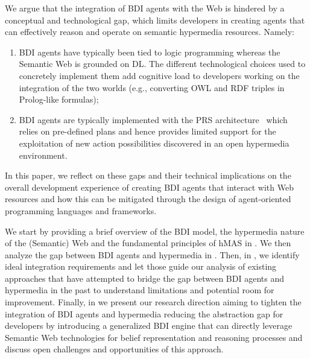 \documentclass[
]{ceurart}
\begin{document}
We argue that the integration of \ac{BDI} agents with the Web
is hindered by a conceptual and technological gap, 
which limits developers in creating agents that can effectively reason and operate on semantic hypermedia resources.
Namely:
\begin{enumerate}[label={(G\arabic*)}]
  \item \ac{BDI} agents have typically been tied to logic programming
  whereas the Semantic Web is grounded on \ac{DL}. The different technological choices used to concretely implement them add cognitive load to developers working on the integration of the two worlds (e.g., converting \ac{OWL} and \ac{RDF} triples in Prolog-like formulas);
  \label{gap:logic}
  \item \ac{BDI} agents are typically implemented with the \ac{PRS} architecture~\cite{georgeff1986pieee} which relies on pre-defined plans and hence provides limited support for the exploitation of new action possibilities discovered in an open hypermedia environment.
  \label{gap:open-world}
\end{enumerate}

In this paper, we reflect on these gaps and their technical implications on the overall development experience of creating \ac{BDI} agents that interact with Web resources and how this can be mitigated through the design of agent-oriented programming languages and frameworks. 

We start by providing a brief overview of the \ac{BDI} model, the hypermedia nature of the (Semantic) Web and the fundamental principles of \ac{hMAS} in .
%
We then analyze the gap between \ac{BDI} agents and hypermedia in .
%
Then,
in ,
we identify ideal integration requirements and let those guide our analysis of existing approaches that have attempted to bridge the gap between \ac{BDI} agents and hypermedia in the past to understand limitations and potential room for improvement.
%
Finally, in  we present our research direction
aiming to tighten the integration of \ac{BDI} agents and hypermedia
reducing the abstraction gap for developers 
by introducing a generalized \ac{BDI} engine
that can directly leverage Semantic Web technologies for belief representation and reasoning processes
and discuss open challenges and opportunities of this approach.

\end{document}
